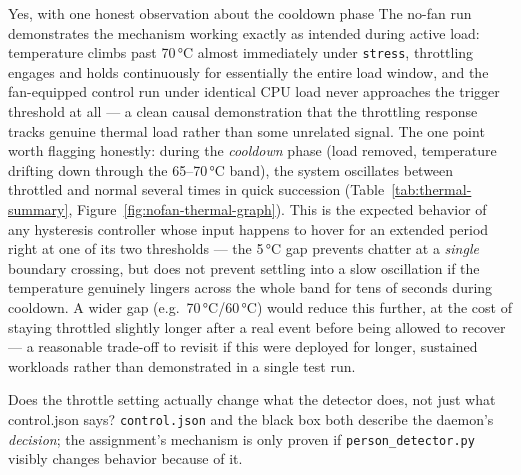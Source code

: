 \begin{answersection}{Yes, with one honest observation about the cooldown phase}
The no-fan run demonstrates the mechanism working exactly as intended
during active load: temperature climbs past 70\,°C almost immediately
under \texttt{stress}, throttling engages and holds continuously for
essentially the entire load window, and the fan-equipped control run
under identical CPU load never approaches the trigger threshold at all
--- a clean causal demonstration that the throttling response tracks
genuine thermal load rather than some unrelated signal. The one point
worth flagging honestly: during the \emph{cooldown} phase (load removed,
temperature drifting down through the 65--70\,°C band), the system
oscillates between throttled and normal several times in quick
succession (Table~\ref{tab:thermal-summary}, Figure~\ref{fig:nofan-thermal-graph}).
This is the expected behavior of any hysteresis controller whose input
happens to hover for an extended period right at one of its two
thresholds --- the 5\,°C gap prevents chatter at a \emph{single} boundary
crossing, but does not prevent settling into a slow oscillation if the
temperature genuinely lingers across the whole band for tens of seconds
during cooldown. A wider gap (e.g.\ 70\,°C/60\,°C) would reduce this
further, at the cost of staying throttled slightly longer after a real
event before being allowed to recover --- a reasonable trade-off to
revisit if this were deployed for longer, sustained workloads rather than
demonstrated in a single test run.
\end{answersection}

\begin{questionsection}{Does the throttle setting actually change what the detector does, not just what control.json says?}
\texttt{control.json} and the black box both describe the daemon's
\emph{decision}; the assignment's mechanism is only proven if
\texttt{person\_detector.py} visibly changes behavior because of it.
\end{questionsection}

